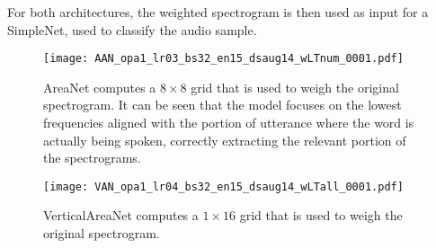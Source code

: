 For both architectures, the weighted spectrogram is then used as input for a
SimpleNet, used to classify the audio sample.

\begin{figure}[t!]
    \centering
    \texttt{[image: AAN\_opa1\_lr03\_bs32\_en15\_dsaug14\_wLTnum\_0001.pdf]}
    \caption{AreaNet computes a $8 \times 8$ grid that is used to weigh the
    original spectrogram.
    It can be seen that the model focuses on the lowest frequencies aligned
    with the portion of utterance where the word is actually being spoken,
    correctly extracting the relevant portion of the spectrograms. }%
    \label{fig:attention_weights_area}
\end{figure}

\begin{figure}[t!]
    \centering
    \texttt{[image: VAN\_opa1\_lr04\_bs32\_en15\_dsaug14\_wLTall\_0001.pdf]}
    \caption{VerticalAreaNet computes a $1 \times 16$ grid that is used to
        weigh the original 
    spectrogram.}%
    \label{fig:attention_weights_vertical}
\end{figure}
